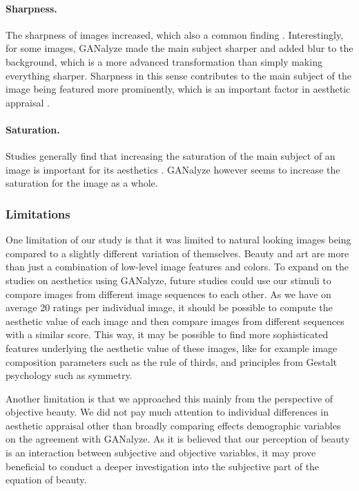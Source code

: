 \documentclass[../main.tex]{subfiles}
\begin{document}
\paragraph{Sharpness.} The sharpness of images increased, which also a common finding \parencite{redi2015beauty}. Interestingly, for some images, GANalyze made the main subject sharper and added blur to the background, which is a more advanced transformation than simply making everything sharper. Sharpness in this sense contributes to the main subject of the image being featured more prominently, which is an important factor in aesthetic appraisal \parencite{wong2009saliency}.

\paragraph{Saturation.} Studies generally find that increasing the saturation of the main subject of an image is important for its aesthetics \parencite{wong2009saliency}. GANalyze however seems to increase the saturation for the image as a whole.


\subsubsection{Limitations}
One limitation of our study is that it was limited to natural looking images being compared to a slightly different variation of themselves. Beauty and art are more than just a combination of low-level image features and colors. To expand on the studies on aesthetics using GANalyze, future studies could use our stimuli to compare images from different image sequences to each other. As we have on average 20 ratings per individual image, it should be possible to compute the aesthetic value of each image and then compare images from different sequences with a similar score. This way, it may be possible to find more sophisticated features underlying the aesthetic value of these images, like for example image composition parameters such as the rule of thirds, and principles from Gestalt psychology such as symmetry.

Another limitation is that we approached this mainly from the perspective of objective beauty. We did not pay much attention to individual differences in aesthetic appraisal other than broadly comparing effects demographic variables on the agreement with GANalyze. As it is believed that our perception of beauty is an interaction between subjective and objective variables, it may prove beneficial to conduct a deeper investigation into the subjective part of the equation of beauty.

\end{document}
